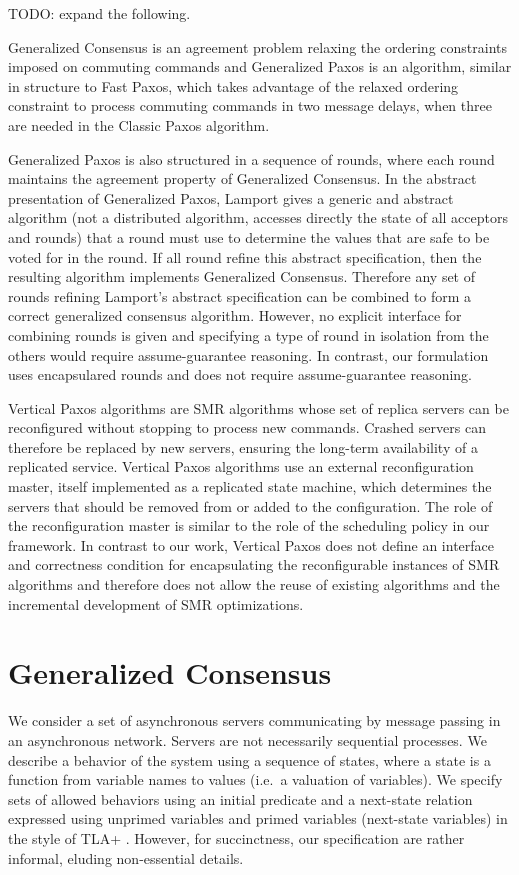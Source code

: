 \documentclass{llncs}
\begin{document}
TODO\@: expand the following.

Generalized Consensus is an agreement problem relaxing the ordering constraints
imposed on commuting commands and Generalized Paxos \cite{Lamport05GeneralizeConsensus} is an algorithm, similar
in structure to Fast Paxos, which takes advantage of the relaxed ordering
constraint to process commuting commands in two message delays, when three are
needed in the Classic Paxos algorithm.

Generalized Paxos is also structured in a sequence of rounds, 
where each round maintains the agreement property of Generalized Consensus.
In the abstract presentation of Generalized Paxos, Lamport gives a generic and abstract algorithm (not a distributed algorithm, accesses directly the state of all acceptors and rounds) that a round must use to determine the values that are safe to be voted for in the round.
If all round refine this abstract specification, then the resulting algorithm implements Generalized Consensus. Therefore any set of rounds refining Lamport's abstract specification can be combined to form a correct generalized consensus algorithm.  
However, no explicit interface for combining rounds is given and specifying a type of round in isolation from the others would require assume-guarantee reasoning. In contrast, our formulation uses encapsulared rounds and does not require assume-guarantee reasoning.

Vertical Paxos algorithms are SMR algorithms whose set of replica servers can
be reconfigured without stopping to process new commands. Crashed servers can
therefore be replaced by new servers, ensuring the long-term availability of a
replicated service. Vertical Paxos algorithms use an external reconfiguration
master, itself implemented as a replicated state machine, which determines
the servers that should be removed from or added to the configuration. The
role of the reconfiguration master is similar to the role of the scheduling
policy in our framework. In contrast to our work, Vertical Paxos does not define
an interface and correctness condition for encapsulating the reconfigurable
instances of SMR algorithms and therefore does not allow the reuse of existing
algorithms and the incremental development of SMR optimizations.

\section{Generalized Consensus}
\label{sec:gc}

We consider a set of asynchronous servers communicating by message passing in
an asynchronous network. Servers are not necessarily sequential processes.
We describe a behavior of the system using a sequence of states,
where a state is a function from variable names to values (i.e.\ a valuation of
variables). We specify sets of allowed behaviors using an initial predicate
and a next-state relation expressed using unprimed variables and primed variables (next-state variables) in the
style of TLA+ \cite{Lamport02SpecifyingSystems}. However, for succinctness, our
specification are rather informal, eluding non-essential details.
\end{document}
